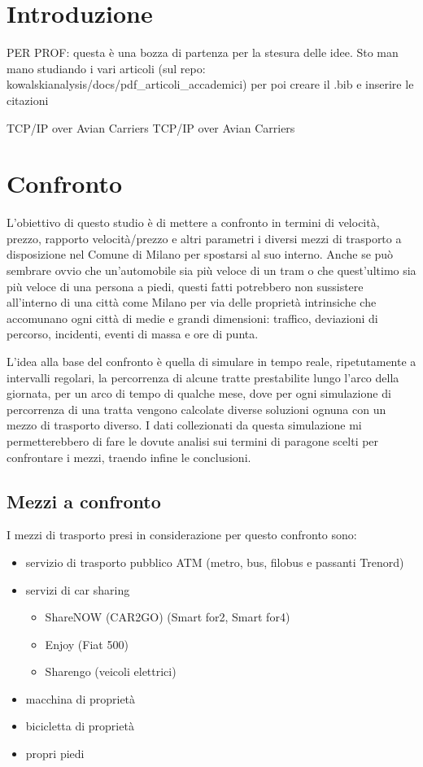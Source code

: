 \documentclass[a4paper]{report}
\begin{document}
	\tableofcontents
	
	\chapter{Introduzione}
	{\LARGE
		PER PROF: questa è una bozza di partenza per la stesura delle idee. Sto man mano studiando i vari articoli (sul repo: kowalskianalysis/docs/pdf\_articoli\_accademici) per poi creare il .bib e inserire le citazioni
	}


	TCP/IP over Avian Carriers\cite{waitzman1990standard}
	TCP/IP over Avian Carriers\cite{waitzman1990standard}
	
	\chapter{Confronto}
	{\large
		L'obiettivo di questo studio è di mettere a confronto in termini di velocità, prezzo, rapporto velocità/prezzo e altri parametri i diversi mezzi di trasporto a disposizione nel Comune di Milano per spostarsi al suo interno. Anche se può sembrare ovvio che un'automobile sia più veloce di un tram o che quest'ultimo sia più veloce di una persona a piedi, questi fatti potrebbero non sussistere all'interno di una città come Milano per via delle proprietà intrinsiche che accomunano ogni città di medie e grandi dimensioni: traffico, deviazioni di percorso, incidenti, eventi di massa e ore di punta.
	}

	{\large
		L'idea alla base del confronto è quella di simulare in tempo reale, ripetutamente a intervalli regolari, la percorrenza di alcune tratte prestabilite lungo l'arco della giornata, per un arco di tempo di qualche mese, dove per ogni simulazione di percorrenza di una tratta vengono calcolate diverse soluzioni ognuna con un mezzo di trasporto diverso. I dati collezionati da questa simulazione mi permetterebbero di fare le dovute analisi sui termini di paragone scelti per confrontare i mezzi, traendo infine le conclusioni.
	}

		\section{Mezzi a confronto}
		{\large
			I mezzi di trasporto presi in considerazione per questo confronto sono:
			
			\begin{itemize}
				\item servizio di trasporto pubblico ATM (metro, bus, filobus e passanti Trenord)
				\item servizi di car sharing
				\begin{itemize}
					\item ShareNOW (CAR2GO) (Smart for2, Smart for4)
					\item Enjoy (Fiat 500)
					\item Sharengo (veicoli elettrici)
				\end{itemize}
				\item macchina di proprietà
				\item bicicletta di proprietà
				\item propri piedi
			\end{itemize}
		}
	
\end{document}
